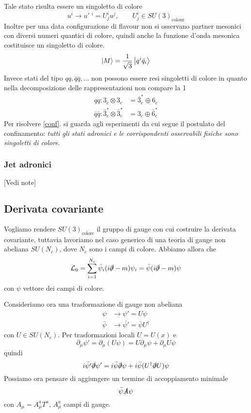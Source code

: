 \documentclass[10pt,a4paper]{article}
\theoremstyle{definition}
\newcommand{\lagr}{\mathcal{L}} %
\begin{document}
Tale stato risulta essere un singoletto di colore 
\[
u^i \to u'\phantom{.}^i = U^i_j u^j,\qquad U^i_j \in SU(3)_{\text{colour}}    
\]
Inoltre per una data configurazione di flavour non si osservano partner mesonici con diversi numeri quantici di colore, quindi anche la funzione d'onda mesonica costituisce un singoletto di colore.
\[
\ket{M} = \frac{1}{\sqrt{3}}\ket{q^i \bar{q}_i}    
\]
Invece stati del tipo $qq, \bar{q}\bar{q}, \dots$ non possono essere resi singoletti di colore in quanto nella decomposizione delle rappresentazioni non compare la 1
\begin{align*}
    qq: 3_c \otimes 3_c &= \bar{3}^*_c \oplus 6_c \\
    \bar{q}\bar{q}: \bar{3}^*_c \otimes \bar{3}^*_c &= 3_c \oplus \bar{6}^*_c
\end{align*}
Per risolvere \ref{conf}. si guarda agli esperimenti da cui segue il postulato del confinamento: \textit{tutti gli stati adronici e le corrispondenti osservabili fisiche sono singoletti di colore}.

\subsubsection{Jet adronici}
[Vedi note]

\subsection{Derivata covariante}
Vogliamo rendere $SU(3)_{\text{colore}}$ il gruppo di gauge con cui costruire la derivata covariante, tuttavia lavoriamo nel caso generico di una teoria di gauge non abeliana $SU(N_c)$, dove $N_c$ sono i campi di colore.
Abbiamo allora che
\[
\lagr_0 = \sum_{i=1}^{N_c}\bar{\psi}_i(i\slashed{\partial} - m)\psi_i = \bar{\psi}(i\slashed{\partial} - m)\psi    
\]
con $\psi$ vettore dei campi di colore.

Consideriamo ora una trasformazione di gauge non abeliana
\begin{align*}
    \psi &\to \psi' = U\psi \\
    \bar{\psi} &\to \bar{\psi'} = \bar{\psi}U^\dagger
\end{align*}
con $U \in SU(N_c)$. Per trasformazioni locali $U = U(x)$ e 
\[
\partial_\mu \psi' = \partial_\mu(U\psi) = U\partial_\mu\psi + \partial_\mu U \psi    
\]
quindi
\[
i\bar{\psi'}\slashed{\partial}\psi' = i\bar{\psi}\slashed{\partial}\psi + i\bar{\psi}(U^\dagger\slashed{\partial}U)\psi    
\]
Possiamo ora pensare di aggiungere un termine di accoppiamento minimale 
\[
\bar{\psi}\slashed{A}\psi    
\]
con $A_\mu = A_\mu^a T^a$, $A_\mu^a$ campi di gauge.
\end{document}
